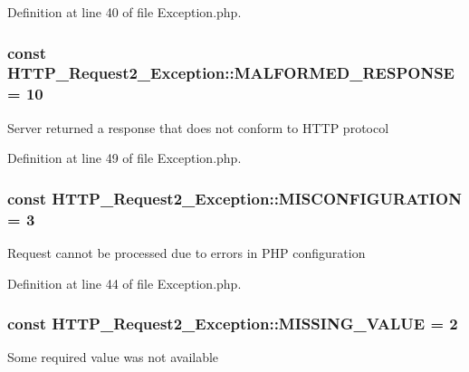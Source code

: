 Definition at line 40 of file Exception.\-php.

\hypertarget{classHTTP__Request2__Exception_a7c38b52fa885536cee022254f8984ac6}{
\subsubsection[{M\-A\-L\-F\-O\-R\-M\-E\-D\-\_\-\-R\-E\-S\-P\-O\-N\-S\-E}]{\setlength{\rightskip}{0pt plus 5cm}const H\-T\-T\-P\-\_\-\-Request2\-\_\-\-Exception\-::\-M\-A\-L\-F\-O\-R\-M\-E\-D\-\_\-\-R\-E\-S\-P\-O\-N\-S\-E = 10}}\label{classHTTP__Request2__Exception_a7c38b52fa885536cee022254f8984ac6}
Server returned a response that does not conform to H\-T\-T\-P protocol 

Definition at line 49 of file Exception.\-php.

\hypertarget{classHTTP__Request2__Exception_a85fe1066fb01f4686c158674ce561f26}{
\subsubsection[{M\-I\-S\-C\-O\-N\-F\-I\-G\-U\-R\-A\-T\-I\-O\-N}]{\setlength{\rightskip}{0pt plus 5cm}const H\-T\-T\-P\-\_\-\-Request2\-\_\-\-Exception\-::\-M\-I\-S\-C\-O\-N\-F\-I\-G\-U\-R\-A\-T\-I\-O\-N = 3}}\label{classHTTP__Request2__Exception_a85fe1066fb01f4686c158674ce561f26}
Request cannot be processed due to errors in P\-H\-P configuration 

Definition at line 44 of file Exception.\-php.

\hypertarget{classHTTP__Request2__Exception_af25f90a5d31c28cfc9da9ea7b3b8fbb8}{
\subsubsection[{M\-I\-S\-S\-I\-N\-G\-\_\-\-V\-A\-L\-U\-E}]{\setlength{\rightskip}{0pt plus 5cm}const H\-T\-T\-P\-\_\-\-Request2\-\_\-\-Exception\-::\-M\-I\-S\-S\-I\-N\-G\-\_\-\-V\-A\-L\-U\-E = 2}}\label{classHTTP__Request2__Exception_af25f90a5d31c28cfc9da9ea7b3b8fbb8}
Some required value was not available 

